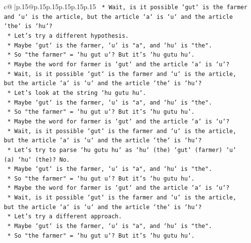 \documentclass{article}
\begin{document}
{\begin{supertabular}{c@{$\;$}|p{.15\linewidth}@{}p{.15\linewidth}p{.15\linewidth}p{.15\linewidth}p{.15\linewidth}p{.15\linewidth}}
{{{\texttt{                *   Wait, is it possible `gut` is the farmer and `u` is the article, but the article `a` is `u` and the article `the` is `hu`?} \\
\texttt{                *   Let's try a different hypothesis.} \\
\texttt{                *   Maybe `gut` is the farmer, `u` is "a", and `hu` is "the".} \\
\texttt{                *   So "the farmer" = `hu gut u`? But it's `hu gutu hu`.} \\
\texttt{                *   Maybe the word for farmer is `gut` and the article `a` is `u`?} \\
\texttt{                *   Wait, is it possible `gut` is the farmer and `u` is the article, but the article `a` is `u` and the article `the` is `hu`?} \\
\texttt{                *   Let's look at the string `hu gutu hu`.} \\
\texttt{                *   Maybe `gut` is the farmer, `u` is "a", and `hu` is "the".} \\
\texttt{                *   So "the farmer" = `hu gut u`? But it's `hu gutu hu`.} \\
\texttt{                *   Maybe the word for farmer is `gut` and the article `a` is `u`?} \\
\texttt{                *   Wait, is it possible `gut` is the farmer and `u` is the article, but the article `a` is `u` and the article `the` is `hu`?} \\
\texttt{                *   Let's try to parse `hu gutu hu` as `hu` (the) `gut` (farmer) `u` (a) `hu` (the)? No.} \\
\texttt{                *   Maybe `gut` is the farmer, `u` is "a", and `hu` is "the".} \\
\texttt{                *   So "the farmer" = `hu gut u`? But it's `hu gutu hu`.} \\
\texttt{                *   Maybe the word for farmer is `gut` and the article `a` is `u`?} \\
\texttt{                *   Wait, is it possible `gut` is the farmer and `u` is the article, but the article `a` is `u` and the article `the` is `hu`?} \\
\texttt{                *   Let's try a different approach.} \\
\texttt{                *   Maybe `gut` is the farmer, `u` is "a", and `hu` is "the".} \\
\texttt{                *   So "the farmer" = `hu gut u`? But it's `hu gutu hu`.} \\
}}}
\end{supertabular}}
\end{document}
